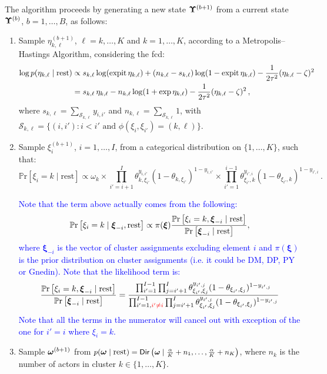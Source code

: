 \documentclass[letterpaper,12pt,openany]{article}
\def\exp#1{{\rm exp}{#1}}
\def\frac#1#2{{{#1}\over{#2}}}
\DeclareMathOperator*{\expit}{expit}
\newcommand{\pr}[1]{\mathbb{P}\text{r}\left[#1\right]}
\def\Dir{\small{\mathsf{Dir}}}
\def\rest{\text{rest}}
\def\al{\alpha}\def\alv{\boldsymbol{\alpha}}
\def\xiv{\boldsymbol{\xi}}
\begin{document}
The algorithm proceeds by generating a new state $\mathbf{\Upsilon}^{(b+1)}$ from a current state $\mathbf{\Upsilon}^{(b)}$, $b=1,\ldots,B$, as follows:
\begin{enumerate}
	
	\item Sample $\eta_{k,\ell}^{(b+1)}$, $\ell = k,\ldots,K$ and $k = 1,\ldots,K$, according to a Metropolis--Hastings Algorithm, considering the fcd:
	\begin{align*}
	\log p(\eta_{k,\ell}\mid\rest) 
	&\propto 
	s_{k,\ell}\log(\expit\eta_{k,\ell}) + (n_{k,\ell}-s_{k,\ell})\log(1-\expit\eta_{k,\ell}) - \frac{1}{2\tau^2}(\eta_{k,\ell} - \zeta)^2 \\
	&= s_{k,\ell}\,\eta_{k,\ell} - n_{k,\ell} \log(1 + \exp\,\eta_{k,\ell}) - \frac{1}{2\tau^2}(\eta_{k,\ell} - \zeta)^2\,,
	\end{align*}
	where $s_{k,\ell} = \sum_{\mathcal{S}_{k,\ell}} y_{i,i'}$ and $n_{k,\ell} = \sum_{\mathcal{S}_{k,\ell}} 1$, with $\mathcal{S}_{k,\ell} = \{(i,i'):i<i'\text{ and }\phi(\xi_i,\xi_{i'})=(k,\ell)\}$. 
	
	\item Sample $\xi_i^{(b+1)}$, $i=1,\ldots,I$, from a categorical distribution on $\{1,\ldots,K\}$, such that:
	$$
	\pr{\xi_i=k\mid\rest}\propto \omega_k
	\times\prod_{i'=i+1}^I \theta_{k,\xi_{i'}}^{y_{i,i'}}(1-\theta_{k,\xi_{i'}})^{1-y_{i,i'}}
	\times\prod_{i'=1}^{i-1} \theta_{\xi_{i'},k}^{y_{i',i}}(1-\theta_{\xi_{i'},k})^{1-y_{i',i}}\,.
	$$
	
	\textcolor{blue}{Note that the term above actually comes from the following:
	$$\pr{\xi_i=k\mid \xiv_{-i}, \rest}\propto \pi(\xiv) \frac{\pr{\xi_i=k, \xiv_{-i} \mid \rest}}{\pr{\xiv_{-i} \mid \rest}},$$
	where $\xiv_{-i}$ is the vector of cluster assignments excluding element $i$ and $\pi(\xiv)$ is the prior distribution on cluster assignments (i.e. it could  be DM, DP, PY or Gnedin). Note that the likelihood term is:
	$$ \frac{\pr{\xi_i=k, \xiv_{-i} \mid \rest}}{\pr{\xiv_{-i} \mid \rest}} = \dfrac{\prod_{i'=1}^{I-1}\prod_{j=i'+1}^I \theta_{\xi_{i'},\xi_j}^{y_{i',j}}(1-\theta_{\xi_{i'},\xi_j})^{1-y_{i',j}}}{\prod_{i'=1, \textcolor{red}{i'\neq i}}^{I-1}\prod_{j=i'+1}^I \theta_{\xi_{i'},\xi_j}^{y_{i',j}}(1-\theta_{\xi_{i'},\xi_j})^{1-y_{i',j}}}$$
	Note that all the terms in the numerator will cancel out with exception of the one for $i'=i$ where $\xi_{i}=k$.
	}
	 
	
	\item Sample $\boldsymbol{\omega}^{(b+1)}$ from $p(\omev\mid\rest) = \Dir\left(\omev\mid\tfrac{\al}{K}+n_1,\ldots,\tfrac{\al}{K}+n_K\right)$, where $n_k$ is the number of actors in cluster $k\in\{1,\ldots,K\}$.
	

\end{enumerate}
\end{document}
